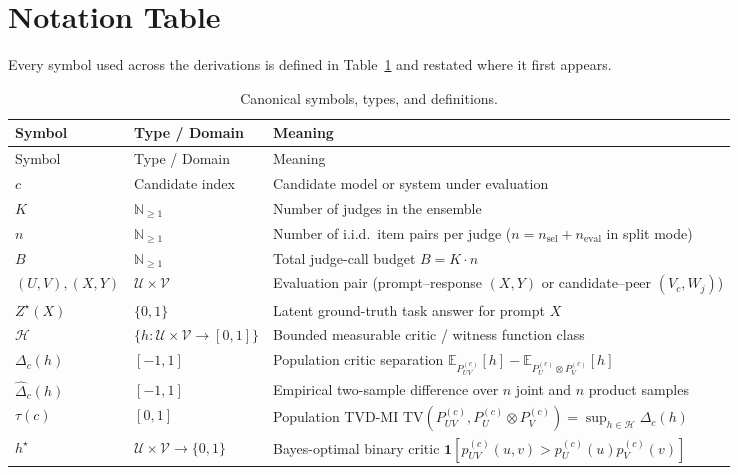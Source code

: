 \documentclass[11pt]{article}
\newcommand{\E}{\mathbb{E}}
\newcommand{\TV}{\mathrm{TV}}
\newcommand{\cH}{\mathcal{H}}
\newcommand{\cU}{\mathcal{U}}
\newcommand{\cV}{\mathcal{V}}
\newcommand{\ind}{\mathbf{1}}
\begin{document}
\section{Notation Table}
\label{sec:notation}

Every symbol used across the derivations is defined in Table~\ref{tab:notation} and restated where it first appears.

{\small
\renewcommand{\arraystretch}{1.15}
\setlength{\tabcolsep}{5pt}
\begin{longtable}{@{}>{\raggedright\arraybackslash}p{2.3cm}>{\raggedright\arraybackslash}p{3.0cm}>{\raggedright\arraybackslash}p{9.2cm}@{}}
\caption{Canonical symbols, types, and definitions.}
\label{tab:notation}\\
\toprule
Symbol & Type / Domain & Meaning \\
\midrule
\endfirsthead
\toprule
Symbol & Type / Domain & Meaning \\
\midrule
\endhead
$c$ & Candidate index & Candidate model or system under evaluation \\
$K$ & $\mathbb{N}_{\ge 1}$ & Number of judges in the ensemble \\
$n$ & $\mathbb{N}_{\ge 1}$ & Number of i.i.d.\ item pairs per judge ($n = n_{\mathrm{sel}} + n_{\mathrm{eval}}$ in split mode) \\
$B$ & $\mathbb{N}_{\ge 1}$ & Total judge-call budget $B = K \cdot n$ \\
$(U,V), (X,Y)$ & $\cU \times \cV$ & Evaluation pair (prompt--response $(X,Y)$ or candidate--peer $(V_c, W_j)$) \\
$Z^\star(X)$ & $\{0,1\}$ & Latent ground-truth task answer for prompt $X$ \\
$\cH$ & $\{h:\cU\times\cV\to[0,1]\}$ & Bounded measurable critic / witness function class \\
$\Delta_c(h)$ & $[-1, 1]$ & Population critic separation $\E_{P^{(c)}_{UV}}[h] - \E_{P^{(c)}_U \otimes P^{(c)}_V}[h]$ \\
$\widehat{\Delta}_c(h)$ & $[-1, 1]$ & Empirical two-sample difference over $n$ joint and $n$ product samples \\
$\tau(c)$ & $[0, 1]$ & Population TVD-MI $\TV(P^{(c)}_{UV}, P^{(c)}_U \otimes P^{(c)}_V) = \sup_{h \in \cH} \Delta_c(h)$ \\
$h^\star$ & $\cU \times \cV \to \{0,1\}$ & Bayes-optimal binary critic $\ind[p^{(c)}_{UV}(u,v) > p^{(c)}_U(u) p^{(c)}_V(v)]$ \\

\end{longtable}}
\end{document}
